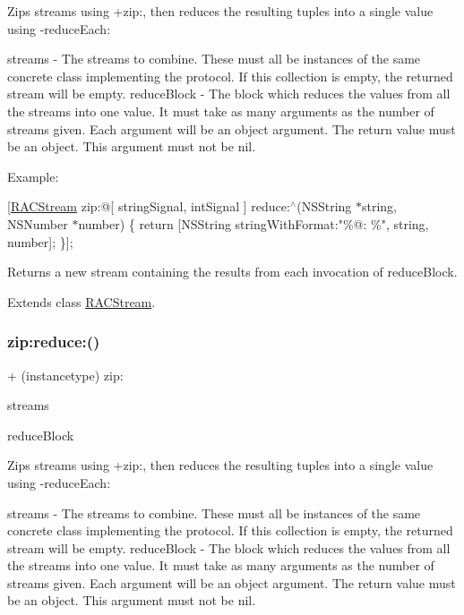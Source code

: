 Zips streams using +zip\+:, then reduces the resulting tuples into a single value using -\/reduce\+Each\+:

streams -\/ The streams to combine. These must all be instances of the same concrete class implementing the protocol. If this collection is empty, the returned stream will be empty. reduce\+Block -\/ The block which reduces the values from all the streams into one value. It must take as many arguments as the number of streams given. Each argument will be an object argument. The return value must be an object. This argument must not be nil.

Example\+:

\mbox{[}\mbox{\hyperlink{interface_r_a_c_stream}{R\+A\+C\+Stream}} zip\+:@\mbox{[} string\+Signal, int\+Signal \mbox{]} reduce\+:$^\wedge$(N\+S\+String $\ast$string, N\+S\+Number $\ast$number) \{ return \mbox{[}N\+S\+String string\+With\+Format\+:"\%@\+: \%", string, number\mbox{]}; \}\mbox{]};

Returns a new stream containing the results from each invocation of {\ttfamily reduce\+Block}. 

Extends class \mbox{\hyperlink{interface_r_a_c_stream_aba7b1d8c9ac130afad52b0baca8ae016}{R\+A\+C\+Stream}}.

\mbox{\label{category_r_a_c_stream_07_operations_08_aba7b1d8c9ac130afad52b0baca8ae016}} 
\subsubsection{\texorpdfstring{zip\+:reduce\+:()}{zip:reduce:()}\hspace{0.1cm}{\footnotesize\ttfamily [3/3]}}
{\footnotesize\ttfamily + (instancetype) zip\+: \begin{DoxyParamCaption}\item[{(id$<$ N\+S\+Fast\+Enumeration $>$)}]{streams }\item[{reduce:(id($^\wedge$)())}]{reduce\+Block }\end{DoxyParamCaption}}

Zips streams using +zip\+:, then reduces the resulting tuples into a single value using -\/reduce\+Each\+:

streams -\/ The streams to combine. These must all be instances of the same concrete class implementing the protocol. If this collection is empty, the returned stream will be empty. reduce\+Block -\/ The block which reduces the values from all the streams into one value. It must take as many arguments as the number of streams given. Each argument will be an object argument. The return value must be an object. This argument must not be nil.

